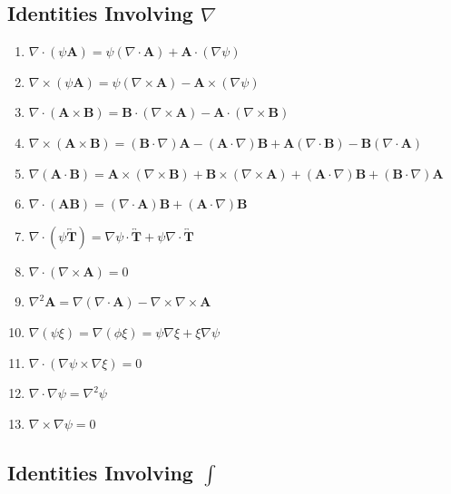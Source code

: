 \subsection{Identities Involving $\nabla$  \textnormal{\cite{griffiths}}}
\renewcommand{\labelenumi}{(\alph{enumi})}
\begin{enumerate}
  \item{$\nabla \cdot (\psi\textbf{A}) = \psi(\nabla\cdot\textbf{A}) + \textbf{A} \cdot (\nabla\psi)$}
  \item{$\nabla \times (\psi\textbf{A}) = \psi(\nabla \times \textbf{A}) - \textbf{A}\times(\nabla\psi)$}
  \item{$\nabla \cdot (\textbf{A} \times \textbf{B}) = \textbf{B} \cdot (\nabla \times \textbf{A}) - \textbf{A} \cdot (\nabla \times \textbf{B})$}
  \item{$\nabla \times (\textbf{A} \times \textbf{B}) = (\textbf{B} \cdot \nabla)\textbf{A} - (\textbf{A} \cdot \nabla)\textbf{B} + \textbf{A}(\nabla \cdot \textbf{B}) - \textbf{B}(\nabla \cdot \textbf{A})$}
  \item{$\nabla(\textbf{A}\cdot\textbf{B}) = \textbf{A} \times (\nabla \times \textbf{B}) + \textbf{B}\times(\nabla\times\textbf{A}) + (\textbf{A}\cdot\nabla)\textbf{B} + (\textbf{B}\cdot\nabla)\textbf{A}$}
  \item{$\nabla\cdot(\textbf{A}\textbf{B}) = (\nabla \cdot \textbf{A})\textbf{B} +(\textbf{A}\cdot\nabla)\textbf{B}$}
  \item{$\nabla \cdot (\psi\overleftrightarrow{\textbf{T}}) = \nabla\psi\cdot\overleftrightarrow{\textbf{T}} + \psi\nabla\cdot\overleftrightarrow{\textbf{T}}$}
  \item{$\nabla \cdot (\nabla \times \textbf{A}) = 0$}
  \item{$\nabla^2\textbf{A} = \nabla(\nabla\cdot\textbf{A}) - \nabla\times\nabla\times\textbf{A}$}
  \item{$\nabla(\psi\xi) = \nabla(\phi\xi) = \psi\nabla\xi + \xi\nabla\psi$}
  \item{$\nabla\cdot(\nabla\psi\times\nabla\xi) = 0$}
  \item{$\nabla \cdot \nabla\psi = \nabla^2\psi$}
  \item{$\nabla \times \nabla\psi = 0$}

\end{enumerate}

\subsection{Identities Involving $\int$ }

